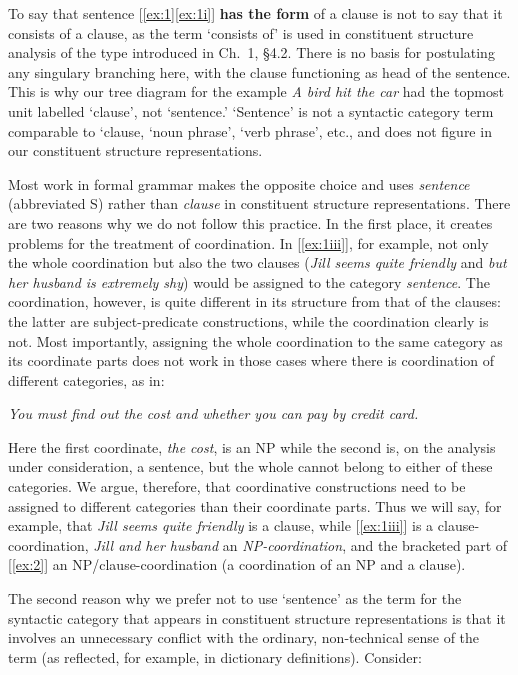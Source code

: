 To say that sentence [\ref{ex:1}\ref{ex:1i}] \textbf{has the form} of a clause is not to say that it consists of a clause, as the term `consists of' is used in constituent structure analysis of the type introduced in Ch.~1, §4.2. There is no basis for postulating any singulary branching here, with the clause functioning as head of the sentence. This is why our tree diagram for the example \textit{A bird hit the car} had the topmost unit labelled `clause', not `sentence.' `Sentence' is not a syntactic category term comparable to `clause, `noun phrase', `verb phrase', etc., and does not figure in our constituent structure representations.

Most work in formal grammar makes the opposite choice and uses \textit{sentence} (abbreviated S) rather than \textit{clause} in constituent structure representations. There are two reasons why we do not follow this practice. In the first place, it creates problems for the treatment of coordination. In [\ref{ex:1iii}], for example, not only the whole coordination but also the two clauses (\textit{Jill seems quite friendly} and \textit{but her husband is extremely shy}) would be assigned to the category \textit{sentence}. The coordination, however, is quite different in its structure from that of the clauses: the latter are subject-predicate constructions, while the coordination clearly is not. Most importantly, assigning the whole coordination to the same category as its coordinate parts does not work in those cases where there is coordination of different categories, as in:

\begin{examples}
    \item \label{ex:2} \itshape You must find out \ob the cost and whether you can pay by credit card\cb.
\end{examples}
Here the first coordinate, \textit{the cost}, is an NP while the second is, on the analysis under consideration, a sentence, but the whole cannot belong to either of these categories. We argue, therefore, that coordinative constructions need to be assigned to different categories than their coordinate parts. Thus we will say, for example, that \textit{Jill seems quite friendly} is a clause, while [\ref{ex:1iii}] is a clause-coordination, \textit{Jill and her husband} an \textit{NP-coordination}, and the bracketed part of [\ref{ex:2}] an NP/clause-coordination (a coordination of an NP and a clause).

The second reason why we prefer not to use `sentence' as the term for the syntactic category that appears in constituent structure representations is that it involves an unnecessary conflict with the ordinary, non-technical sense of the term (as reflected, for example, in dictionary definitions). Consider:

